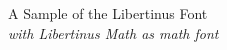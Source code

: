 \documentclass[11pt]{article}
\begin{document}
{\dispfont \LARGE \noindent A Sample of the Libertinus Font}\\

{\large \noindent \textit{with Libertinus Math as math font}}\\[5pt]


\end{document}

